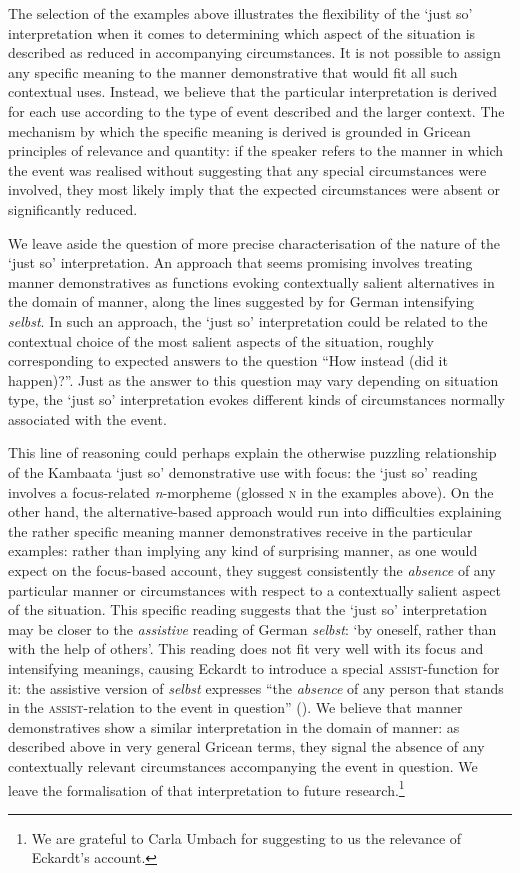 \documentclass[output=paper,colorlinks,citecolor=brown]{langscibook}
\begin{document}
The selection of the examples above illustrates the flexibility of the ‘just so’ interpretation when it comes to determining which aspect of the situation is described as reduced in accompanying circumstances. It is not possible to assign any specific meaning to the manner demonstrative that would fit all such contextual uses. Instead, we believe that the particular interpretation is derived for each use according to the type of event described and the larger context. The mechanism by which the specific meaning is derived is grounded in Gricean principles of relevance and quantity: if the speaker refers to the manner in which the event was realised without suggesting that any special circumstances were involved, they most likely imply that the expected circumstances were absent or significantly reduced.

We leave aside the question of more precise characterisation of the nature of the ‘just so’ interpretation. An approach that seems promising involves treating manner demonstratives as functions evoking contextually salient alternatives in the domain of manner, along the lines suggested by \citet{Eckardt2001} for German intensifying \textit{selbst}. In such an approach, the ‘just so’ interpretation could be related to the contextual choice of the most salient aspects of the situation, roughly corresponding to expected answers to the question “How instead (did it happen)?”. Just as the answer to this question may vary depending on situation type, the ‘just so’ interpretation evokes different kinds of circumstances normally associated with the event.

This line of reasoning could perhaps explain the otherwise puzzling relationship of the Kambaata ‘just so’ demonstrative use with focus: the ‘just so’ reading involves a focus-related \textit{n}{}-morpheme (glossed \textsc{n} in the examples above). On the other hand, the alternative-based approach would run into difficulties explaining the rather specific meaning manner demonstratives receive in the particular examples: rather than implying any kind of surprising manner, as one would expect on the focus-based account, they suggest consistently the \textit{absence} of any particular manner or circumstances with respect to a contextually salient aspect of the situation. This specific reading suggests that the ‘just so’ interpretation may be closer to the \textit{assistive} reading of German \textit{selbst}: ‘by oneself, rather than with the help of others’. This reading does not fit very well with its focus and intensifying meanings, causing Eckardt to introduce a special \textsc{assist}{}-function for it: the assistive version of \textit{selbst} expresses “the \textit{absence} of any person that stands in the \textsc{assist}{}-relation to the event in question” (\citeyear[402]{Eckardt2001}). We believe that manner demonstratives show a similar interpretation in the domain of manner: as described above in very general Gricean terms, they signal the absence of any contextually relevant circumstances accompanying the event in question. We leave the formalisation of that interpretation to future research.\footnote{We are grateful to Carla Umbach for suggesting to us the relevance of Eckardt’s account.}
\end{document}
